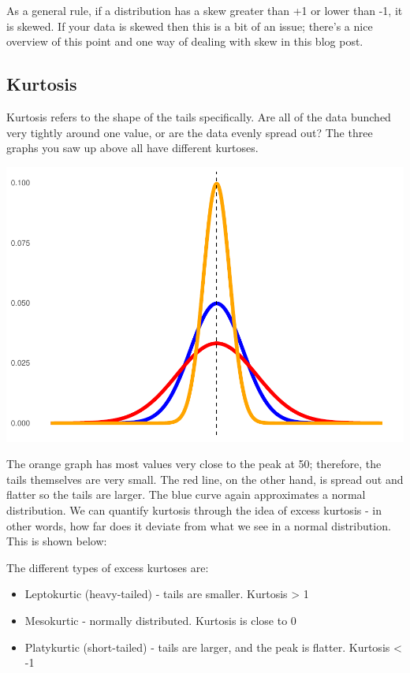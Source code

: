 \documentclass[
]{book}
\providecommand{\tightlist}{%
  \setlength{\itemsep}{0pt}\setlength{\parskip}{0pt}}
\begin{document}
As a general rule, if a distribution has a skew greater than +1 or lower than -1, it is skewed. If your data is skewed then this is a bit of an issue; there's a nice overview of this point and one way of dealing with skew in this blog post.

\hypertarget{kurtosis}{%
\subsection{Kurtosis}\label{kurtosis}}

Kurtosis refers to the shape of the tails specifically. Are all of the data bunched very tightly around one value, or are the data evenly spread out? The three graphs you saw up above all have different kurtoses.

\begin{center}\includegraphics{_main_files/figure-latex/unnamed-chunk-71-1} \end{center}

The orange graph has most values very close to the peak at 50; therefore, the tails themselves are very small. The red line, on the other hand, is spread out and flatter so the tails are larger. The blue curve again approximates a normal distribution. We can quantify kurtosis through the idea of excess kurtosis - in other words, how far does it deviate from what we see in a normal distribution. This is shown below:

The different types of excess kurtoses are:

\begin{itemize}
\tightlist
\item
  Leptokurtic (heavy-tailed) - tails are smaller. Kurtosis \textgreater{} 1
\item
  Mesokurtic - normally distributed. Kurtosis is close to 0
\item
  Platykurtic (short-tailed) - tails are larger, and the peak is flatter. Kurtosis \textless{} -1
\end{itemize}
\end{document}
